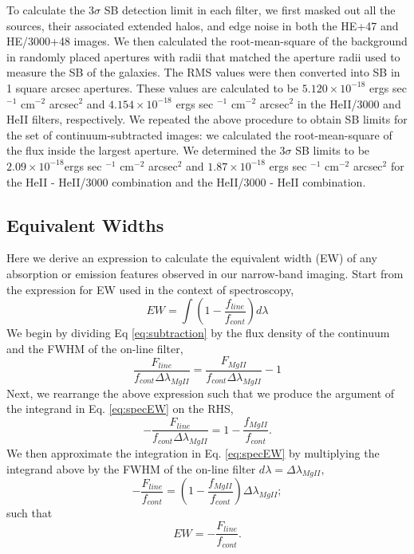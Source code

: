 \documentclass[twocolumn]{aastex6}
\begin{document}
To calculate the $3\sigma$ SB detection limit in each filter, we first masked out all the sources, their associated extended halos, and edge noise in both the HE+47 and HE/3000+48 images. We then calculated the root-mean-square of the background in randomly placed apertures with radii that matched the aperture radii used to measure the SB of the galaxies. The RMS values were then converted into SB in 1 square arcsec apertures. These values are calculated to be $5.120\times10^{-18}$ ergs sec $^{-1}$ cm$^{-2}$ arcsec$^2$ and $4.154\times10^{-18} $ ergs sec $^{-1}$ cm$^{-2}$ arcsec$^2$ in the HeII/3000 and HeII filters, respectively. We repeated the above procedure to obtain SB limits for the set of continuum-subtracted images: we calculated the root-mean-square of the flux inside the largest aperture. We determined the 3$\sigma$ SB limits to be $2.09\times10^{-18}$ergs sec $^{-1}$ cm$^{-2}$ arcsec$^2$ and $1.87\times10^{-18}$ ergs sec $^{-1}$ cm$^{-2}$ arcsec$^2$ for the HeII - HeII/3000 combination and the HeII/3000 - HeII combination. 

\subsection{Equivalent Widths}
Here we derive an expression to calculate the equivalent width (EW) of any absorption or emission features observed in our narrow-band imaging. Start from the expression for EW used in the context of spectroscopy,
\begin{equation}
EW=\int (1-\frac{f_{line}}{f_{cont}})d\lambda
\label{eq:specEW}
\end{equation}
We begin by dividing Eq \ref{eq:subtraction} by the flux density of the continuum and the FWHM of the on-line filter,
\begin{equation}
\frac{F_{line}}{f_{cont}\Delta \lambda_{MgII}}=\frac{F_{MgII}}{f_{cont}\Delta \lambda_{MgII}}- 1
\end{equation}
Next, we rearrange the above expression such that we produce the argument of the integrand in Eq. \ref{eq:specEW} on the RHS,
\begin{equation}
-\frac{F_{line}}{f_{cont}\Delta \lambda_{MgII}}=1-\frac{f_{MgII}}{f_{cont}}.
\end{equation}
We then approximate the integration in Eq. \ref{eq:specEW} by multiplying the integrand above by the FWHM of the on-line filter $d\lambda=\Delta \lambda_{MgII},$
\begin{equation}
-\frac{F_{line}}{f_{cont}}=(1-\frac{f_{MgII}}{f_{cont}})\Delta \lambda_{MgII};
\end{equation}
such that
\begin{equation}
EW=-\frac{F_{line}}{f_{cont}}.
\end{equation}
\end{document}
